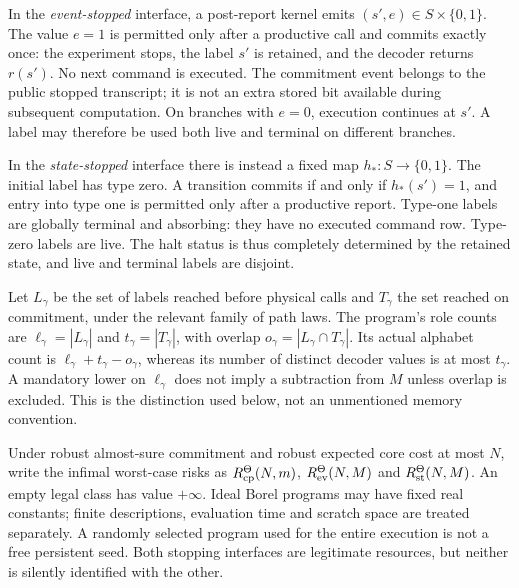 \begin{definition}\label{def:stopping}
In the \emph{event-stopped} interface, a post-report kernel emits $(s',e)\in S\times\{0,1\}$. The value $e=1$ is permitted only after a productive call and commits exactly once: the experiment stops, the label $s'$ is retained, and the decoder returns $r(s')$. No next command is executed. The commitment event belongs to the public stopped transcript; it is not an extra stored bit available during subsequent computation. On branches with $e=0$, execution continues at $s'$. A label may therefore be used both live and terminal on different branches.

In the \emph{state-stopped} interface there is instead a fixed map $h_*:S\to\{0,1\}$. The initial label has type zero. A transition commits if and only if $h_*(s')=1$, and entry into type one is permitted only after a productive report. Type-one labels are globally terminal and absorbing: they have no executed command row. Type-zero labels are live. The halt status is thus completely determined by the retained state, and live and terminal labels are disjoint.
\end{definition}

Let $L_\gamma$ be the set of labels reached before physical calls and $T_\gamma$ the set reached on commitment, under the relevant family of path laws. The program's role counts are $\ell_\gamma=|L_\gamma|$ and $t_\gamma=|T_\gamma|$, with overlap $o_\gamma=|L_\gamma\cap T_\gamma|$. Its actual alphabet count is $\ell_\gamma+t_\gamma-o_\gamma$, whereas its number of distinct decoder values is at most $t_\gamma$. A mandatory lower on $\ell_\gamma$ does not imply a subtraction from $M$ unless overlap is excluded. This is the distinction used below, not an unmentioned memory convention.

Under robust almost-sure commitment and robust expected core cost at most $N$, write the infimal worst-case risks as $R_{\mathrm{cp}}^\Theta(N,m)$, $R_{\mathrm{ev}}^\Theta(N,M)$ and $R_{\mathrm{st}}^\Theta(N,M)$. An empty legal class has value $+\infty$. Ideal Borel programs may have fixed real constants; finite descriptions, evaluation time and scratch space are treated separately. A randomly selected program used for the entire execution is not a free persistent seed. Both stopping interfaces are legitimate resources, but neither is silently identified with the other.

